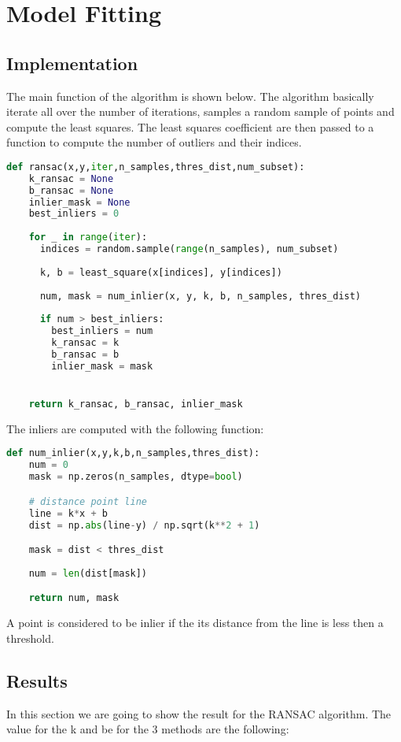 \documentclass{ETHExercise}
\begin{document}
\newpage
\section{Model Fitting}

\subsection{Implementation}

The main function of the algorithm is shown below. The algorithm
basically iterate all over the number of iterations, samples a random sample of
points and compute the least squares. The least squares coefficient are then 
passed to a function to compute the number of outliers and their indices.
\begin{lstlisting}[language=Python, caption=RANSAC]
  def ransac(x,y,iter,n_samples,thres_dist,num_subset):
    k_ransac = None
    b_ransac = None
    inlier_mask = None
    best_inliers = 0
  
    for _ in range(iter):
      indices = random.sample(range(n_samples), num_subset)
    
      k, b = least_square(x[indices], y[indices])
    
      num, mask = num_inlier(x, y, k, b, n_samples, thres_dist)
      
      if num > best_inliers:
        best_inliers = num
        k_ransac = k
        b_ransac = b
        inlier_mask = mask


    return k_ransac, b_ransac, inlier_mask
\end{lstlisting}

The inliers are computed with the following function:
\begin{lstlisting}[language=Python, caption=num\_inlier]
  def num_inlier(x,y,k,b,n_samples,thres_dist):
    num = 0
    mask = np.zeros(n_samples, dtype=bool)

    # distance point line
    line = k*x + b
    dist = np.abs(line-y) / np.sqrt(k**2 + 1)

    mask = dist < thres_dist
  
    num = len(dist[mask])

    return num, mask
\end{lstlisting}
A point is considered to be inlier if the its distance from the line is less then a threshold.


\subsection{Results}
In this section we are going to show the result for the RANSAC algorithm.
The value for the k and be for the 3 methods are the following:
\end{document}
